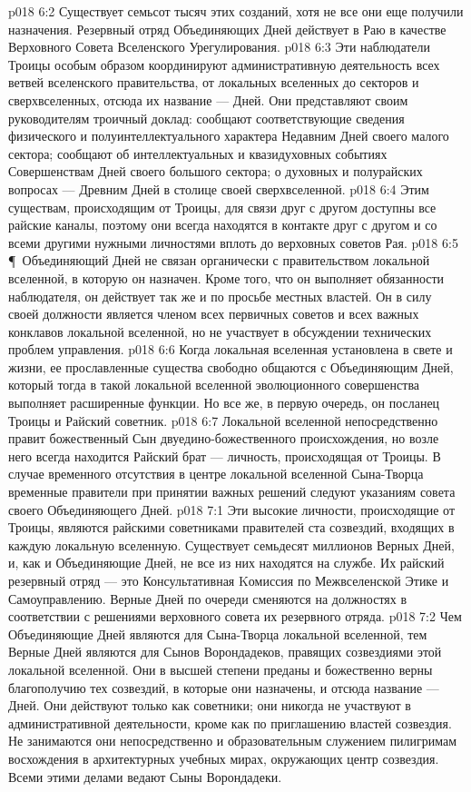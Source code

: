 \vs p018 6:2 Существует семьсот тысяч этих созданий, хотя не все они еще получили назначения. Резервный отряд Объединяющих Дней действует в Раю в качестве Верховного Совета Вселенского Урегулирования.
\vs p018 6:3 Эти наблюдатели Троицы особым образом координируют административную деятельность всех ветвей вселенского правительства, от локальных вселенных до секторов и сверхвселенных, отсюда их название ---  Дней. Они представляют своим руководителям троичный доклад: сообщают соответствующие сведения физического и полуинтеллектуального характера Недавним Дней своего малого сектора; сообщают об интеллектуальных и квазидуховных событиях Совершенствам Дней своего большого сектора; о духовных и полурайских вопросах --- Древним Дней в столице своей сверхвселенной.
\vs p018 6:4 Этим существам, происходящим от Троицы, для связи друг с другом доступны все райские каналы, поэтому они всегда находятся в контакте друг с другом и со всеми другими нужными личностями вплоть до верховных советов Рая.
\vs p018 6:5 \P\ Объединяющий Дней не связан органически с правительством локальной вселенной, в которую он назначен. Кроме того, что он выполняет обязанности наблюдателя, он действует так же и по просьбе местных властей. Он в силу своей должности является членом всех первичных советов и всех важных конклавов локальной вселенной, но не участвует в обсуждении технических проблем управления.
\vs p018 6:6 Когда локальная вселенная установлена в свете и жизни, ее прославленные существа свободно общаются с Объединяющим Дней, который тогда в такой локальной вселенной эволюционного совершенства выполняет расширенные функции. Но все же, в первую очередь, он посланец Троицы и Райский советник.
\vs p018 6:7 Локальной вселенной непосредственно правит божественный Сын двуедино\hyp{}божественного происхождения, но возле него всегда находится Райский брат --- личность, происходящая от Троицы. В случае временного отсутствия в центре локальной вселенной Сына\hyp{}Творца временные правители при принятии важных решений следуют указаниям совета своего Объединяющего Дней.
\vs p018 7:1 Эти высокие личности, происходящие от Троицы, являются райскими советниками правителей ста созвездий, входящих в каждую локальную вселенную. Существует семьдесят миллионов Верных Дней, и, как и Объединяющие Дней, не все из них находятся на службе. Их райский резервный отряд --- это Консультативная Kомиссия по Межвселенской Этике и Самоуправлению. Верные Дней по очереди сменяются на должностях в соответствии с решениями верховного совета их резервного отряда.
\vs p018 7:2 Чем Объединяющие Дней являются для Сына\hyp{}Творца локальной вселенной, тем Верные Дней являются для Сынов Ворондадеков, правящих созвездиями этой локальной вселенной. Они в высшей степени преданы и божественно верны благополучию тех созвездий, в которые они назначены, и отсюда название ---  Дней. Они действуют только как советники; они никогда не участвуют в административной деятельности, кроме как по приглашению властей созвездия. Не занимаются они непосредственно и образовательным служением пилигримам восхождения в архитектурных учебных мирах, окружающих центр созвездия. Всеми этими делами ведают Сыны Ворондадеки.
